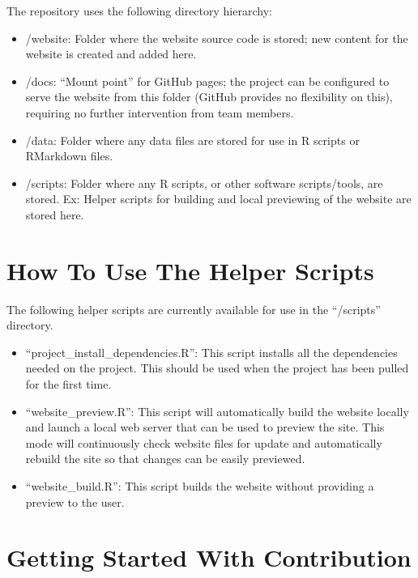 \documentclass[
]{book}
\providecommand{\tightlist}{%
  \setlength{\itemsep}{0pt}\setlength{\parskip}{0pt}}
\begin{document}
The repository uses the following directory hierarchy:

\begin{itemize}
\tightlist
\item
  /website: Folder where the website source code is stored; new content for the website is created and added here.
\item
  /docs: ``Mount point'' for GitHub pages; the project can be configured to serve the website from this folder (GitHub provides no flexibility on this), requiring no further intervention from team members.
\item
  /data: Folder where any data files are stored for use in R scripts or RMarkdown files.
\item
  /scripts: Folder where any R scripts, or other software scripts/tools, are stored. Ex: Helper scripts for building and local previewing of the website are stored here.
\end{itemize}

\hypertarget{how-to-use-the-helper-scripts}{%
\section{How To Use The Helper Scripts}\label{how-to-use-the-helper-scripts}}

The following helper scripts are currently available for use in the ``/scripts'' directory.

\begin{itemize}
\tightlist
\item
  ``project\_install\_dependencies.R'': This script installs all the dependencies needed on the project. This should be used when the project has been pulled for the first time.
\item
  ``website\_preview.R'': This script will automatically build the website locally and launch a local web server that can be used to preview the site. This mode will continuously check website files for update and automatically rebuild the site so that changes can be easily previewed.
\item
  ``website\_build.R'': This script builds the website without providing a preview to the user.
\end{itemize}

\hypertarget{getting-started-with-contribution}{%
\section{Getting Started With Contribution}\label{getting-started-with-contribution}}
\end{document}

